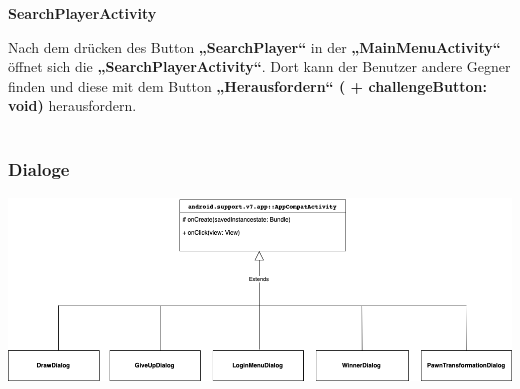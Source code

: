 \documentclass[parskip=full]{scrartcl}
\begin{document}
\begin{description}
					 \item \textbf{\Large{SearchPlayerActivity }} 
					
					Nach dem drücken des Button \textbf {„SearchPlayer“} in der \textbf {„MainMenuActivity“} öffnet sich die \textbf {„SearchPlayerActivity“}. Dort kann der Benutzer andere Gegner finden und diese mit dem Button \textbf {„Herausfordern“ ( + challengeButton: void)} herausfordern. \\ \\
					
					\end{description}
			
				\newpage	
		\subsubsection{Dialoge}
		\begin{minipage}{\linewidth}
			\centering
			\includegraphics[width=1\linewidth]{Diagramme/DialogDiagram}
			\label{fig:dialoge}
		\end{minipage}
\end{document}
